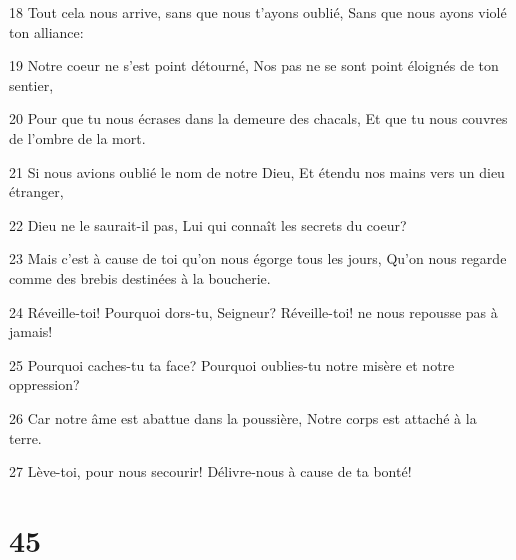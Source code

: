\par 18 Tout cela nous arrive, sans que nous t'ayons oublié, Sans que nous ayons violé ton alliance:
\par 19 Notre coeur ne s'est point détourné, Nos pas ne se sont point éloignés de ton sentier,
\par 20 Pour que tu nous écrases dans la demeure des chacals, Et que tu nous couvres de l'ombre de la mort.
\par 21 Si nous avions oublié le nom de notre Dieu, Et étendu nos mains vers un dieu étranger,
\par 22 Dieu ne le saurait-il pas, Lui qui connaît les secrets du coeur?
\par 23 Mais c'est à cause de toi qu'on nous égorge tous les jours, Qu'on nous regarde comme des brebis destinées à la boucherie.
\par 24 Réveille-toi! Pourquoi dors-tu, Seigneur? Réveille-toi! ne nous repousse pas à jamais!
\par 25 Pourquoi caches-tu ta face? Pourquoi oublies-tu notre misère et notre oppression?
\par 26 Car notre âme est abattue dans la poussière, Notre corps est attaché à la terre.
\par 27 Lève-toi, pour nous secourir! Délivre-nous à cause de ta bonté!

\chapter{45}

